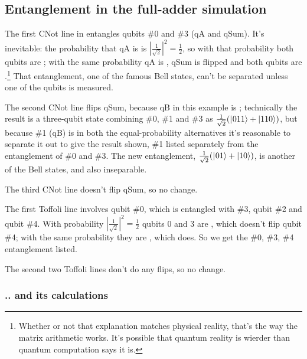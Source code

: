 \subsection{Entanglement in the full-adder simulation}

The first CNot line in  entangles qubits \#0 and \#3 (qA and qSum). It's inevitable: the probability that qA is \zero{} is $|\frac{1}{\sqrt2}|^{2}=\frac{1}{2}$, so with that probability both qubits are \zero{}; with the same probability qA is \one{}, qSum is flipped and both qubits are \one{}.\footnote{Whether or not that explanation matches physical reality, that's the way the matrix arithmetic works. It's possible that quantum reality is wierder than quantum computation says it is.} That entanglement, one of the famous Bell states, can't be separated unless one of the qubits is measured.

The second CNot line flips qSum, because qB in this example is \one{}; technically the result is a three-qubit state combining \#0, \#1 and \#3 as $\frac{1}{\sqrt2}(|\hspace{0.5pt}011\rangle+|110\rangle)$, but because \#1 (qB) is \one{} in both the equal-probability alternatives it's reasonable to separate it out to give the result shown, \#1 listed separately from the entanglement of \#0 and \#3. The new entanglement, $\frac{1}{\sqrt2}(|\hspace{0.5pt}01\rangle+|10\rangle)$, is another of the Bell states, and also inseparable.

The third CNot line doesn't flip qSum, so no change.

The first Toffoli line involves qubit \#0, which is entangled with \#3, qubit \#2 and qubit \#4. With probability $|\frac{1}{\sqrt2}|^{2}=\frac{1}{2}$ qubits 0 and 3 are \zeroone, which doesn't flip qubit \#4; with the same probability they are \onezero{}, which does. So we get the \#0, \#3, \#4 entanglement listed.

The second two Toffoli lines don't do any flips, so no change. 

\subsubsection{.. and its calculations}

